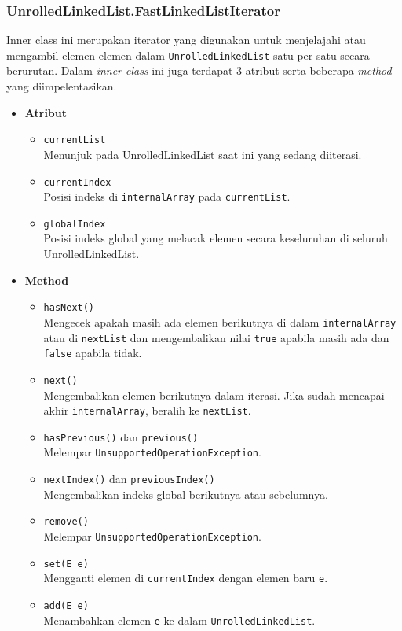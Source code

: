 \subsubsection{UnrolledLinkedList.FastLinkedListIterator}
Inner class ini merupakan iterator yang digunakan untuk menjelajahi atau mengambil elemen-elemen dalam \texttt{UnrolledLinkedList} satu per satu secara berurutan. Dalam \textit{inner class} ini juga terdapat 3 atribut serta beberapa \textit{method} yang diimpelentasikan.
\begin{itemize}
    \item \textbf{Atribut}
    \begin{itemize}
        \item \texttt{currentList}
        \\ Menunjuk pada UnrolledLinkedList saat ini yang sedang diiterasi.
        \item \texttt{currentIndex}
        \\ Posisi indeks di \texttt{internalArray} pada \texttt{currentList}.
        \item \texttt{globalIndex}
        \\ Posisi indeks global yang melacak elemen secara keseluruhan di seluruh UnrolledLinkedList.
    \end{itemize}

    \item \textbf{Method}
    \begin{itemize}
        \item \texttt{hasNext()}
        \\ Mengecek apakah masih ada elemen berikutnya di dalam \texttt{internalArray} atau di \texttt{nextList} dan mengembalikan nilai \texttt{true} apabila masih ada dan \texttt{false} apabila tidak.
        \item \texttt{next()}
        \\Mengembalikan elemen berikutnya dalam iterasi. Jika sudah mencapai akhir \texttt{internalArray}, beralih ke \texttt{nextList}.
        \item \texttt{hasPrevious()} dan \texttt{previous()}
        \\Melempar \texttt{UnsupportedOperationException}.
        \item \texttt{nextIndex()} dan \texttt{previousIndex()}
        \\Mengembalikan indeks global berikutnya atau sebelumnya.
        \item \texttt{remove()}
        \\Melempar \texttt{UnsupportedOperationException}.
        \item \texttt{set(E e)}
        \\Mengganti elemen di \texttt{currentIndex} dengan elemen baru \texttt{e}.
        \item \texttt{add(E e)}
        \\Menambahkan elemen \texttt{e} ke dalam \texttt{UnrolledLinkedList}.
    \end{itemize}
\end{itemize}

